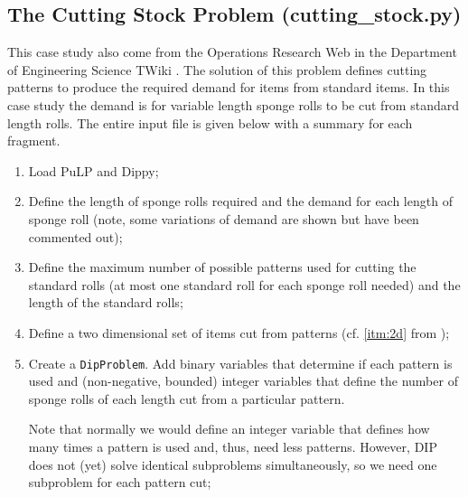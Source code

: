 \subsection{The Cutting Stock Problem (cutting\_stock.py)} \label{sbs:sponge}

This case study also come from the Operations Research Web in the Department of Engineering Science TWiki \cite{sponge}. The solution of this problem defines cutting patterns to produce the required demand for items from standard items. In this case study the demand is for variable length sponge rolls to be cut from standard length rolls. The entire input file is given below with a summary for each fragment.

\begin{enumerate}
\item Load PuLP and Dippy;


\item Define the length of sponge rolls required and the demand for each length of sponge roll (note, some variations of demand are shown but have been commented out);



\item Define the maximum number of possible patterns used for cutting the standard rolls (at most one standard roll for each sponge roll needed) and the length of the standard rolls;


\item Define a two dimensional set of items cut from patterns (cf. \ref{itm:2d} from );


\newpage

\item Create a \texttt{DipProblem}. Add binary variables that determine if each pattern is used and (non-negative, bounded) integer variables that define the number of sponge rolls of each length cut from a particular pattern.

Note that normally we would define an integer variable that defines how many times a pattern is used and, thus, need less patterns. However, \ac{DIP} does not (yet) solve identical subproblems simultaneously, so we need one subproblem for each pattern cut;


\end{enumerate}
